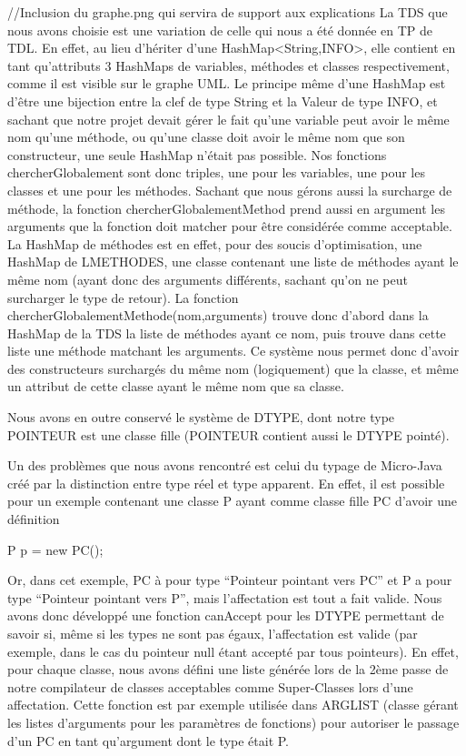 //Inclusion du graphe.png qui servira de support aux explications
La TDS que nous avons choisie est une variation de celle qui nous a été donnée en TP de TDL. En effet, au lieu d'hériter d'une HashMap<String,INFO>, elle 
contient en tant qu'attributs 3 HashMaps de variables, méthodes et classes respectivement, comme il est visible sur le graphe UML. Le principe même d'une
HashMap est d'être une bijection entre 
la clef de type String et la Valeur de type INFO, et sachant que notre projet devait gérer le fait qu'une variable peut avoir le même nom qu'une méthode, 
ou qu'une classe doit avoir le même nom que son constructeur, une seule HashMap n'était pas possible. Nos fonctions chercherGlobalement sont donc triples, 
une pour les variables, une pour les classes et une pour les méthodes.
Sachant que nous gérons aussi la surcharge de méthode, la fonction chercherGlobalementMethod prend aussi en argument les arguments que la fonction doit 
matcher pour être considérée comme acceptable. La HashMap de méthodes est en effet, pour des soucis d'optimisation, une HashMap de LMETHODES, une classe 
contenant une liste de méthodes ayant le même nom (ayant donc des arguments différents, sachant qu'on ne peut surcharger le type de retour). La fonction 
chercherGlobalementMethode(nom,arguments) trouve donc d'abord dans la HashMap de la TDS la liste de méthodes ayant ce nom, puis trouve dans cette liste 
une méthode matchant les arguments. 
Ce système nous permet donc d'avoir des constructeurs surchargés du même nom (logiquement) que la classe, et même un attribut de cette classe ayant le même 
nom que sa classe.

Nous avons en outre conservé le système de DTYPE, dont notre type POINTEUR est une classe fille (POINTEUR contient aussi le DTYPE pointé).

Un des problèmes que nous avons rencontré est celui du typage de Micro-Java créé par la distinction entre type réel et type apparent. En effet, il est possible
pour un exemple contenant une classe P ayant comme classe fille PC d'avoir une définition
 
  P p = new PC();

Or, dans cet exemple, PC à pour type ``Pointeur pointant vers PC'' et P a pour type ``Pointeur pointant vers P'', mais l'affectation est tout a fait valide. Nous avons donc
développé une fonction canAccept pour les DTYPE permettant de savoir si, même si les types ne sont pas égaux, l'affectation est valide (par exemple, dans le cas du pointeur null
étant accepté par tous pointeurs). En effet, pour chaque classe, nous avons défini une liste générée lors de la 2ème passe de notre compilateur de classes acceptables
comme Super-Classes lors d'une affectation. Cette fonction est par exemple utilisée dans ARGLIST (classe gérant les listes d'arguments pour les paramètres de fonctions) pour autoriser
le passage d'un PC en tant qu'argument dont le type était P.

